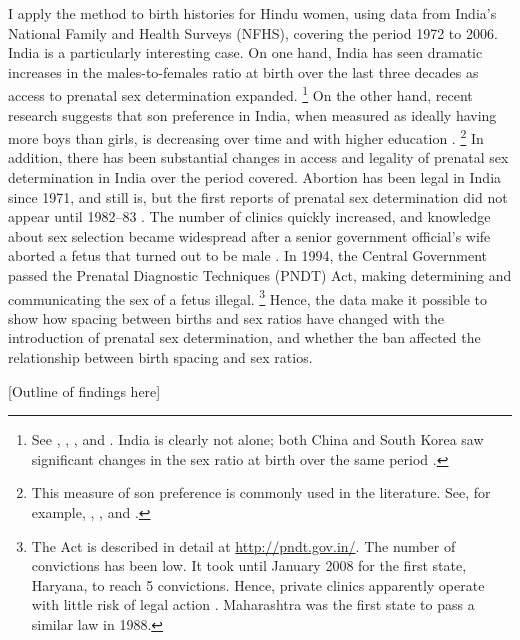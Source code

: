 \documentclass[12pt,letterpaper]{article}
\begin{document}
I apply the method to birth histories for Hindu women, using data from 
India's National Family and Health Surveys (NFHS), covering the period 
1972 to 2006. 
India is a particularly interesting case.
On one hand, India has seen dramatic increases in the males-to-females ratio 
at birth over the last three decades as access to prenatal sex determination 
expanded.%
\footnote{
See \citet{das_gupta97}, \citet{Sudha1999},
\citet{Arnold2002}, \cite{retherford03b} and \citet{jha06}.
India is clearly not alone; both China and South Korea saw
significant changes in the sex ratio at birth over the same period 
\citep{Yi1993,park95}.
}
On the other hand, recent research suggests that son preference in 
India, when measured as ideally having more boys than girls, is decreasing 
over time and with higher education \citep{bhat03,pande07}.%
\footnote{
This measure of son preference is commonly used in the literature. 
See, for example, \citet{clark00}, \citet{Jensen2009}, and \cite{Hu2015}.
}
In addition, there has been substantial changes in access and legality of
prenatal sex determination in India over the period covered.
Abortion has been legal in India since 1971, and still is, but the 
first reports of prenatal sex determination did
not appear until 1982--83 \citep{Sudha1999,bhat06,Grover2006}.
The number of clinics quickly increased, and knowledge about sex selection 
became widespread after a senior government official's wife aborted a 
fetus that turned out to be male \citep[p.\ 598]{Sudha1999}.
In 1994, the Central Government passed the Prenatal Diagnostic Techniques 
(PNDT) Act, making determining and communicating the sex of a fetus illegal.%
\footnote{
The Act is described in detail at \href{http://pndt.gov.in/}{http://pndt.gov.in/}.
The number of convictions has been low.
It took until January 2008 for the first state, Haryana, to reach 5 convictions.
Hence, private clinics apparently operate with little risk of legal action 
\citep{Sudha1999}.
Maharashtra was the first state to pass a similar law in 1988.
}
Hence, the data make it possible to show how spacing between births and
sex ratios have changed with the introduction of prenatal sex determination,
and whether the ban affected the relationship between birth spacing and sex 
ratios.

[Outline of findings here]


% 
% 
% 
\end{document}
